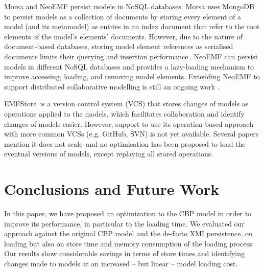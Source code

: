 \documentclass{llncs}
\begin{document}
Morsa \cite{pagan2011morsa} and NeoEMF \cite{daniel2016neoemf} persist models in NoSQL databases.
Morsa uses MongoDB\,\cite{mongodb2017what} to persist models as a collection of documents by storing every element of a model (and its metamodel) as entries in an index document that refer to the root elements of the model's elements' documents.%
However, due to the nature of document-based databases, storing model element references as serialised documents limits their querying and insertion performance\,\cite{barmpis2014evaluation}.
NeoEMF can persist models in different NoSQL databases and provides a lazy-loading mechanism to improve accessing, loading, and removing model elements. Extending NeoEMF to support distributed collaborative modelling is still an ongoing work \cite{sunye2017model}.

EMFStore\,\cite{koegel2010emfstore} is a version control system (VCS) that stores changes of models as operations applied to the models, which facilitates collaboration and identify changes of models easier.
However, support to use its operation-based approach with more common VCSs (e.g. GitHub, SVN) is not yet available. Several papers mention it does not scale\,\cite{pagan2011morsa,kolovos2013research} and no optimisation has been proposed to load the eventual versions of models, except replaying all stored operations. 

\section{Conclusions and Future Work}
\label{sec:conclusions}
In this paper, we have proposed an optimization to the CBP model in order to improve its performance, in particular to the loading time.
We evaluated our approach against the original CBP model and the de-facto XMI persistence, on loading but also on store time and memory consumption of the loading process. 
Our results show considerable savings in terms of store times and identifying changes made to models at an increased -- but linear -- model loading cost. 
\end{document}
